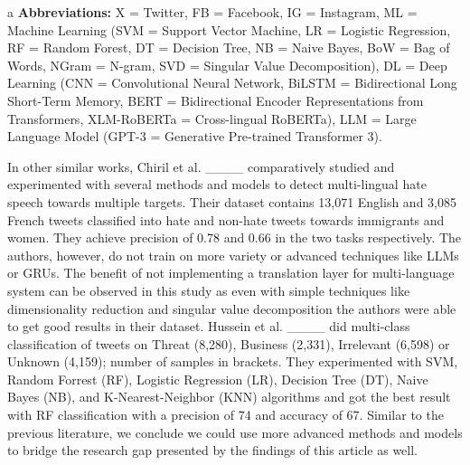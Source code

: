 \begin{table*}[ht]
\begin{tablenotes}
\item[a] \textbf{Abbreviations:} X = Twitter, FB = Facebook, IG = Instagram, ML = Machine Learning (SVM = Support Vector Machine, LR = Logistic Regression, RF = Random Forest, DT = Decision Tree, NB = Naive Bayes, BoW = Bag of Words, NGram = N-gram, SVD = Singular Value Decomposition), DL = Deep Learning (CNN = Convolutional Neural Network, BiLSTM = Bidirectional Long Short-Term Memory, BERT = Bidirectional Encoder Representations from Transformers, XLM-RoBERTa = Cross-lingual RoBERTa), LLM = Large Language Model (GPT-3 = Generative Pre-trained Transformer 3).
\end{tablenotes}
\end{table*}

In other similar works, Chiril et al. ____ comparatively studied and experimented with several methods and models to detect multi-lingual hate speech towards multiple targets. Their dataset contains 13,071 English and 3,085 French tweets classified into hate and non-hate tweets towards immigrants and women. They achieve precision of 0.78 and 0.66 in the two tasks respectively. The authors, however, do not train on more variety or advanced techniques like LLMs or GRUs. The benefit of not implementing a translation layer for multi-language system can be observed in this study as even with simple techniques like dimensionality reduction and singular value decomposition the authors were able to get good results in their dataset. Hussein et al. ____ did multi-class classification of tweets on Threat (8,280), Business (2,331), Irrelevant (6,598) or Unknown (4,159); number of samples in brackets. They experimented with SVM, Random Forrest (RF), Logistic Regression (LR), Decision Tree (DT), Naive Bayes (NB), and K-Nearest-Neighbor (KNN) algorithms and got the best result with RF classification with a precision of 74 and accuracy of 67. Similar to the previous literature, we conclude we could use more advanced methods and models to bridge the research gap presented by the findings of this article as well. 


